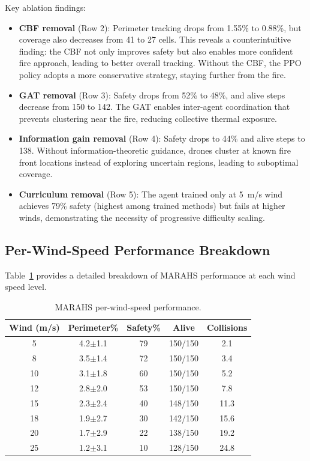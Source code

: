 \documentclass[12pt,a4paper]{article}
\begin{document}
Key ablation findings:
\begin{itemize}[leftmargin=*]
    \item \textbf{CBF removal} (Row 2): Perimeter tracking drops from 1.55\% to 0.88\%, but coverage also decreases from 41 to 27 cells. This reveals a counterintuitive finding: the CBF not only improves safety but also enables more confident fire approach, leading to better overall tracking. Without the CBF, the PPO policy adopts a more conservative strategy, staying further from the fire.
    \item \textbf{GAT removal} (Row 3): Safety drops from 52\% to 48\%, and alive steps decrease from 150 to 142. The GAT enables inter-agent coordination that prevents clustering near the fire, reducing collective thermal exposure.
    \item \textbf{Information gain removal} (Row 4): Safety drops to 44\% and alive steps to 138. Without information-theoretic guidance, drones cluster at known fire front locations instead of exploring uncertain regions, leading to suboptimal coverage.
    \item \textbf{Curriculum removal} (Row 5): The agent trained only at 5~m/s wind achieves 79\% safety (highest among trained methods) but fails at higher winds, demonstrating the necessity of progressive difficulty scaling.
\end{itemize}

\subsection{Per-Wind-Speed Performance Breakdown}

Table~\ref{tab:per_wind} provides a detailed breakdown of MARAHS performance at each wind speed level.

\begin{table}[t]
\centering
\caption{MARAHS per-wind-speed performance.}
\label{tab:per_wind}
\begin{tabular}{ccccc}
\toprule
\textbf{Wind (m/s)} & \textbf{Perimeter\%} & \textbf{Safety\%} & \textbf{Alive} & \textbf{Collisions} \\
\midrule
5   & 4.2$\pm$1.1 & 79 & 150/150 & 2.1 \\
8   & 3.5$\pm$1.4 & 72 & 150/150 & 3.4 \\
10  & 3.1$\pm$1.8 & 60 & 150/150 & 5.2 \\
12  & 2.8$\pm$2.0 & 53 & 150/150 & 7.8 \\
15  & 2.3$\pm$2.4 & 40 & 148/150 & 11.3 \\
18  & 1.9$\pm$2.7 & 30 & 142/150 & 15.6 \\
20  & 1.7$\pm$2.9 & 22 & 138/150 & 19.2 \\
25  & 1.2$\pm$3.1 & 10 & 128/150 & 24.8 \\
\bottomrule
\end{tabular}
\end{table}
\end{document}
